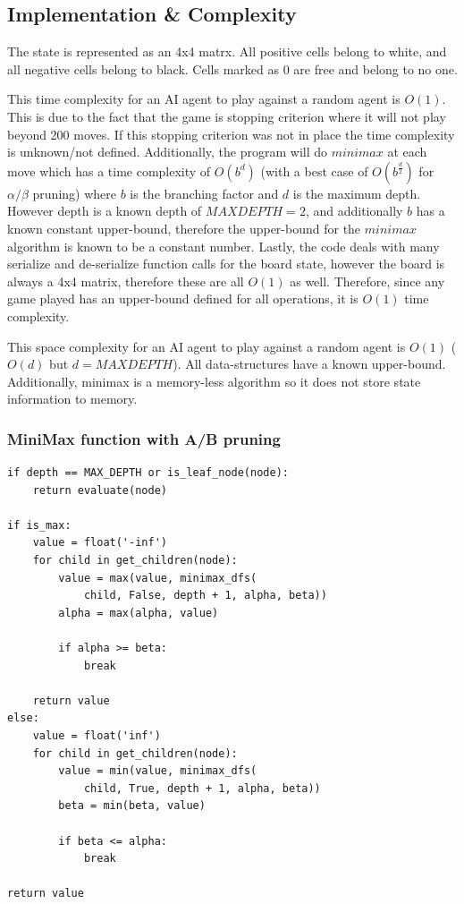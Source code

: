 \documentclass{article}
\begin{document}
\subsection{Implementation \& Complexity}
The state is represented as an 4x4 matrx. All positive cells belong to white, and all negative cells belong to black. Cells marked as $0$ are free and belong to no one.

This time complexity for an AI agent to play against a random agent is $O(1)$. This is due to the fact that the game is stopping criterion where it will not play beyond 200 moves. If this stopping criterion was not in place the time complexity is unknown/not defined. Additionally, the program will do $minimax$ at each move which has a time complexity of $O(b^d)$ (with a best case of $O(b^{\frac{d}{2}})$ for $\alpha / \beta$ pruning) where $b$ is the branching factor and $d$ is the maximum depth. However depth is a known depth of $MAXDEPTH=2$, and additionally $b$ has a known constant upper-bound,  therefore the upper-bound for the $minimax$ algorithm is known to be a constant number. Lastly, the code deals with many serialize and de-serialize function calls for the board state, however the board is always a 4x4 matrix, therefore these are all $O(1)$ as well. Therefore, since any game played has an upper-bound defined for all operations, it is $O(1)$ time complexity.

This space complexity for an AI agent to play against a random agent is $O(1)$ ($O(d)$ but $d = MAX DEPTH$). All data-structures have a known upper-bound. Additionally, minimax is a memory-less algorithm so it does not store state information to memory.

\subsubsection{MiniMax function with A/B pruning}

\begin{lstlisting}
if depth == MAX_DEPTH or is_leaf_node(node):
    return evaluate(node)

if is_max:
    value = float('-inf')
    for child in get_children(node):
        value = max(value, minimax_dfs(
            child, False, depth + 1, alpha, beta))
        alpha = max(alpha, value)

        if alpha >= beta:
            break

    return value
else:
    value = float('inf')
    for child in get_children(node):
        value = min(value, minimax_dfs(
            child, True, depth + 1, alpha, beta))
        beta = min(beta, value)

        if beta <= alpha:
            break

return value
\end{lstlisting}
\end{document}
